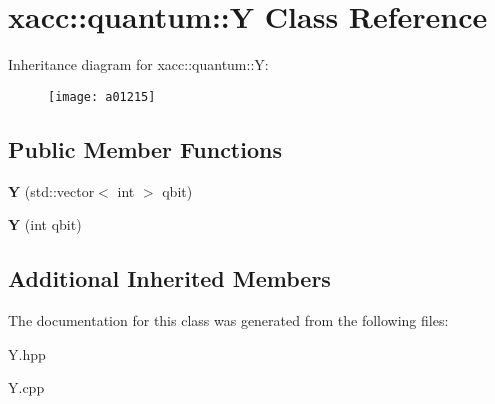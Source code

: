 \hypertarget{a01215}{}\section{xacc\+:\+:quantum\+:\+:Y Class Reference}
\label{a01215}
Inheritance diagram for xacc\+:\+:quantum\+:\+:Y\+:\begin{figure}[H]
\begin{center}
\leavevmode
\texttt{[image: a01215]}
\end{center}
\end{figure}
\subsection*{Public Member Functions}
\begin{DoxyCompactItemize}
\item 
\mbox{\label{a01215_a7959be0aa8221c0b1ba445771f5ecf0a}} 
{\bfseries Y} (std\+::vector$<$ int $>$ qbit)
\item 
\mbox{\label{a01215_aea2b37ac45208cbf6a47e0074e4a9653}} 
{\bfseries Y} (int qbit)
\end{DoxyCompactItemize}
\subsection*{Additional Inherited Members}


The documentation for this class was generated from the following files\+:\begin{DoxyCompactItemize}
\item 
Y.\+hpp\item 
Y.\+cpp\end{DoxyCompactItemize}
